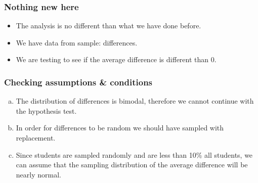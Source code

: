 \documentclass[notes,11pt, aspectratio=169]{beamer}
\begin{document}

\begin{frame}
\frametitle{Nothing new here}

\begin{itemize}

\item The analysis is no different than what we have done before.

\item We have data from  sample: differences. 

\item We are testing to see if the average difference is different than 0.

\end{itemize}

\end{frame}


\begin{frame}
\frametitle{Checking assumptions \& conditions}


\begin{enumerate}[(a)]
\item The distribution of differences is bimodal, therefore we cannot continue with the hypothesis test.
\item In order for differences to be random we should have sampled with replacement.
\item Since students are sampled randomly and are less than 10\% all students, we can assume that the sampling distribution of the average difference will be nearly normal.
\end{enumerate}

\end{frame}

\end{document}
